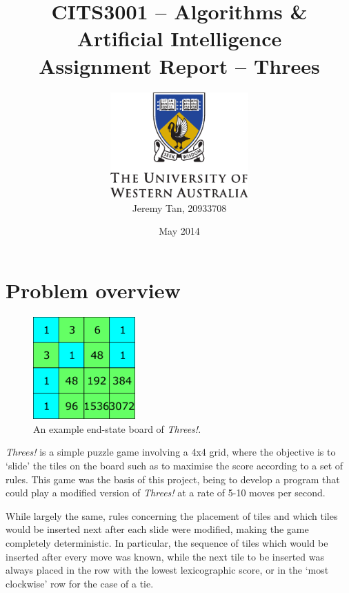 \documentclass[a4paper, 11pt, titlepage]{report}
\newcommand{\threes}{\emph{Threes!}}
\begin{document}
\begin{titlepage}
	\title{CITS3001 -- Algorithms \& Artificial Intelligence\\Assignment Report -- Threes}
	\author{\includegraphics[width=150pt]{figures/uwacrest.pdf}\\[2em]
		Jeremy Tan, 20933708 }
	\date{May 2014}
	\maketitle
	\centering
\end{titlepage}

\chapter{Problem overview}
\begin{figure}[H]
	\centering
	\includegraphics[width=0.35\textwidth]{figures/endboard.pdf}
	\caption{An example end-state board of \threes{}.}
\end{figure}

\threes{}\cite{threes} is a simple puzzle game involving a 4x4 grid, where the objective is to `slide' the tiles on the board such as to maximise the score according to a set of rules. This game was the basis of this project, being to develop a program that could play a modified version of \threes{} at a rate of 5-10 moves per second.

While largely the same, rules concerning the placement of tiles and which tiles would be inserted next after each slide were modified, making the game completely deterministic. In particular, the sequence of tiles which would be inserted after every move was known, while the next tile to be inserted was always placed in the row with the lowest lexicographic score, or in the `most clockwise' row for the case of a tie.
\end{document}
